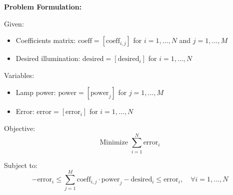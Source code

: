 \documentclass{article}
\begin{document}
\textbf{Problem Formulation:}

Given:
\begin{itemize}
    \item Coefficients matrix: \(\text{coeff} = [\text{coeff}_{i,j}]\) for \(i = 1, \ldots, N\) and \(j = 1, \ldots, M\)
    \item Desired illumination: \(\text{desired} = [\text{desired}_i]\) for \(i = 1, \ldots, N\)
\end{itemize}

Variables:
\begin{itemize}
    \item Lamp power: \(\text{power} = [\text{power}_j]\) for \(j = 1, \ldots, M\)
    \item Error: \(\text{error} = [\text{error}_i]\) for \(i = 1, \ldots, N\)
\end{itemize}

Objective:
\[
\text{Minimize } \sum_{i=1}^{N} \text{error}_i
\]

Subject to:
\[
-\text{error}_i \leq \sum_{j=1}^{M} \text{coeff}_{i,j} \cdot \text{power}_j - \text{desired}_i \leq \text{error}_i, \quad \forall i = 1, \ldots, N
\]
\end{document}
